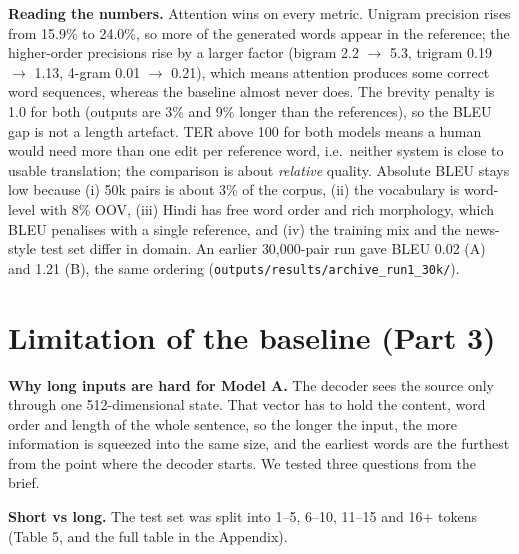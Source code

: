 \documentclass[10pt,a4paper]{article}
\newcommand{\code}[1]{\texttt{#1}}
\begin{document}
\textbf{Reading the numbers.} Attention wins on every metric. Unigram precision rises from 15.9\% to 24.0\%, so more of the generated words
appear in the reference; the higher-order precisions rise by a larger factor (bigram 2.2 $\rightarrow$ 5.3, trigram 0.19 $\rightarrow$ 1.13,
4-gram 0.01 $\rightarrow$ 0.21), which means attention produces some correct word sequences, whereas the baseline almost never does.
The brevity penalty is 1.0 for both (outputs are 3\% and 9\% longer than the references), so the BLEU gap is not a length artefact. TER above
100 for both models means a human would need more than one edit per reference word, i.e.\ neither system is close to usable translation;
the comparison is about \emph{relative} quality. Absolute BLEU stays low because (i) 50k pairs is about 3\% of the corpus, (ii) the vocabulary is
word-level with 8\% OOV, (iii) Hindi has free word order and rich morphology, which BLEU penalises with a single reference, and (iv) the training
mix and the news-style test set differ in domain. An earlier 30,000-pair run gave BLEU 0.02 (A) and 1.21 (B), the same ordering
(\code{outputs/results/archive\_run1\_30k/}).

\section{Limitation of the baseline (Part 3)}
\textbf{Why long inputs are hard for Model A.} The decoder sees the source only through one 512-dimensional state. That vector has to hold
the content, word order and length of the whole sentence, so the longer the input, the more information is squeezed into the same size,
and the earliest words are the furthest from the point where the decoder starts. We tested three questions from the brief.

\textbf{Short vs long.} The test set was split into 1--5, 6--10, 11--15 and 16+ tokens (Table 5, and the full table in the Appendix).
\begin{table}[H]\centering\small\tabCompare\caption{Baseline (A) vs attention (B) by English sentence length. ``repeats'' is the share of outputs with a
repeated 3-gram.}\end{table}
\end{document}
